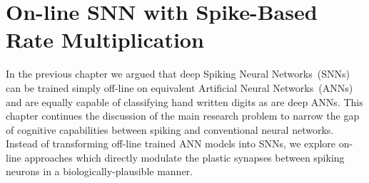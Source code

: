 \DIFdelbegin %
\DIFdelend \DIFaddbegin \chapter[On-line SNN Training with SRM]{\DIFaddend On-line SNN \DIFdelbegin {}\DIFdelend \DIFaddbegin {}\DIFaddend with Spike-Based Rate Multiplication}
\label{cha:sdlm}
In the previous chapter we argued that deep Spiking Neural Networks~(SNNs) can be trained simply off-line on equivalent Artificial Neural Networks~(ANNs) and are equally capable of classifying hand written digits as are deep ANNs.
This chapter continues the discussion of the main research problem to narrow the gap of cognitive capabilities between spiking and conventional neural networks.
Instead of transforming off-line trained ANN models into SNNs, we explore on-line approaches which directly modulate the plastic synapses between spiking neurons in a biologically-plausible manner.


